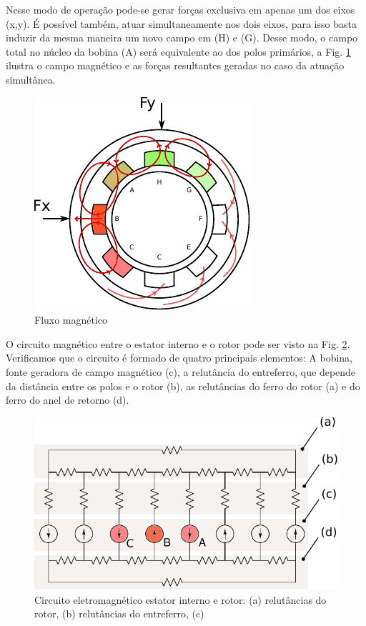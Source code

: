 Nesse modo de operação pode-se gerar forças exclusiva em apenas um dos eixos (x,y). É possível também, atuar simultaneamente nos dois eixos, para isso basta induzir da mesma maneira um novo campo em (H) e (G). Desse modo, o campo total no núcleo da bobina (A) será equivalente ao dos polos primários, a Fig. \ref{fig:modelo:mancal:estator:interno:fluxo2} ilustra o campo magnético e as forças resultantes geradas no caso da atuação simultânea.

 \begin{figure}[ht!]
 	\centering
 	\includegraphics[width=0.7\linewidth]{./Figs/modelo_mancal_estator_interno_fluxo2}
 	\caption{Fluxo magnético}
 	\label{fig:modelo:mancal:estator:interno:fluxo2}
 \end{figure}

O circuito magnético entre o estator interno e o rotor pode ser visto na Fig. \ref{fig:modelo:circuito:ativo:explicativo}. Verificamos que o circuito é formado de quatro principais elementos: A bobina, fonte geradora de campo magnético (c), a relutância do entreferro, que depende da distância entre os polos e o rotor (b), as relutâncias do ferro do rotor (a) e do ferro do anel de retorno (d).

\begin{figure}[ht!]
\centering
\includegraphics[width=0.7\linewidth]{./Figs/modelo_circuito_ativo_explicativo}
\caption[Circuito eletromagnético estator interno e rotor]{Circuito eletromagnético estator interno e rotor: (a) relutâncias do rotor, (b) relutâncias do entreferro, (c) } 
\label{fig:modelo:circuito:ativo:explicativo}
\end{figure}

